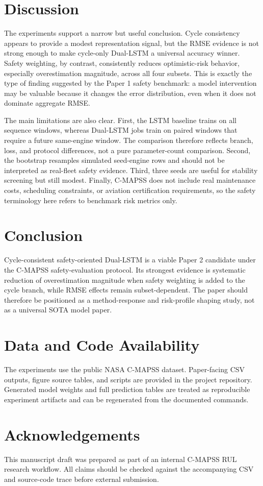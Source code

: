 \documentclass[10pt,twocolumn]{article}
\begin{document}
\section{Discussion}
The experiments support a narrow but useful conclusion. Cycle consistency appears to provide a modest representation signal, but the RMSE evidence is not strong enough to make cycle-only Dual-LSTM a universal accuracy winner. Safety weighting, by contrast, consistently reduces optimistic-risk behavior, especially overestimation magnitude, across all four subsets. This is exactly the type of finding suggested by the Paper 1 safety benchmark: a model intervention may be valuable because it changes the error distribution, even when it does not dominate aggregate RMSE.

The main limitations are also clear. First, the LSTM baseline trains on all sequence windows, whereas Dual-LSTM jobs train on paired windows that require a future same-engine window. The comparison therefore reflects branch, loss, and protocol differences, not a pure parameter-count comparison. Second, the bootstrap resamples simulated seed-engine rows and should not be interpreted as real-fleet safety evidence. Third, three seeds are useful for stability screening but still modest. Finally, C-MAPSS does not include real maintenance costs, scheduling constraints, or aviation certification requirements, so the safety terminology here refers to benchmark risk metrics only.

\section{Conclusion}
Cycle-consistent safety-oriented Dual-LSTM is a viable Paper 2 candidate under the C-MAPSS safety-evaluation protocol. Its strongest evidence is systematic reduction of overestimation magnitude when safety weighting is added to the cycle branch, while RMSE effects remain subset-dependent. The paper should therefore be positioned as a method-response and risk-profile shaping study, not as a universal SOTA model paper.

\section*{Data and Code Availability}
The experiments use the public NASA C-MAPSS dataset. Paper-facing CSV outputs, figure source tables, and scripts are provided in the project repository. Generated model weights and full prediction tables are treated as reproducible experiment artifacts and can be regenerated from the documented commands.

\section*{Acknowledgements}
This manuscript draft was prepared as part of an internal C-MAPSS RUL research workflow. All claims should be checked against the accompanying CSV and source-code trace before external submission.



\end{document}
